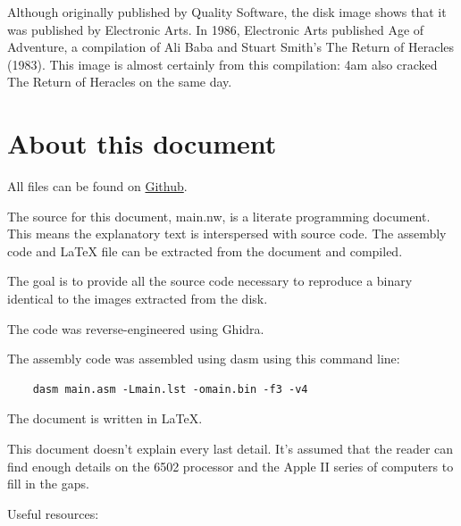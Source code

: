 \documentclass[10pt]{report}
\begin{document}
Although originally published by Quality Software, the disk image shows that it
was published by Electronic Arts. In 1986, Electronic Arts published Age of
Adventure, a compilation of Ali Baba and Stuart Smith's The Return of Heracles (1983).
This image is almost certainly from this compilation: 4am also cracked The
Return of Heracles on the same day.

\section{About this document}

All files can be found on \href{https://github.com/RobertBaruch/ali_baba_reveng}{Github}.

The source for this document, {\Tt{}main.nw\nwendquote}, is a literate programming document. This means the explanatory text is
interspersed with source code. The assembly code and {\Tt{}LaTeX\nwendquote} file can be extracted from the document and compiled.

The goal is to provide all the source code necessary to reproduce a binary
identical to the images extracted from the disk.

The code was reverse-engineered using Ghidra.

The assembly code was assembled using {\Tt{}dasm\nwendquote} using this command line:

\begin{verbatim}
    dasm main.asm -Lmain.lst -omain.bin -f3 -v4
\end{verbatim}

The document is written in \LaTeX.

This document doesn't explain every last detail. It's assumed that the reader can
find enough details on the 6502 processor and the Apple II series of computers
to fill in the gaps.

Useful resources:
\end{document}

